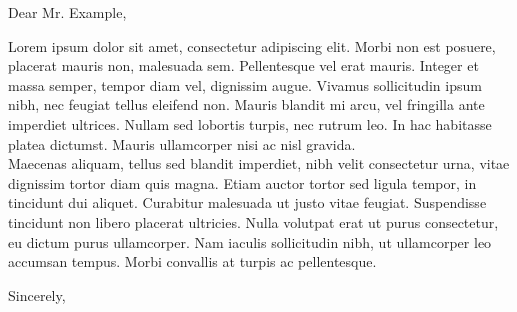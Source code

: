 \begin{letter}{}
  \opening{Dear Mr. Example,}
  Lorem ipsum dolor sit amet, consectetur adipiscing elit. Morbi non est posuere, placerat mauris non, malesuada sem.
  Pellentesque vel erat mauris. Integer et massa semper, tempor diam vel, dignissim augue. Vivamus sollicitudin ipsum
  nibh, nec feugiat tellus eleifend non. Mauris blandit mi arcu, vel fringilla ante imperdiet ultrices. Nullam sed
  lobortis turpis, nec rutrum leo. In hac habitasse platea dictumst. Mauris ullamcorper nisi ac nisl gravida.\\

  Maecenas aliquam, tellus sed blandit imperdiet, nibh velit consectetur urna, vitae dignissim tortor diam quis magna.
  Etiam auctor tortor sed ligula tempor, in tincidunt dui aliquet. Curabitur malesuada ut justo vitae feugiat.
  Suspendisse tincidunt non libero placerat ultricies. Nulla volutpat erat ut purus consectetur, eu dictum purus
  ullamcorper. Nam iaculis sollicitudin nibh, ut ullamcorper leo accumsan tempus. Morbi convallis at turpis ac
  pellentesque. 

  \closing{Sincerely,}

  
  
\end{letter}
